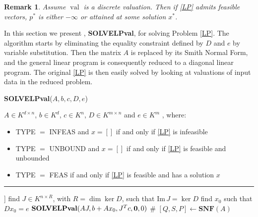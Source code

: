 \documentclass[a4paper,oneside,10pt]{article}
\newtheorem{remark}[theorem]{Remark}
\DeclareMathOperator{\val}{val}
\begin{document}
\begin{remark}
  Assume $\val$ is a discrete valuation. Then
  if \eqref{LP} admits feasible vectors,
  $p^*$ is either $-\infty$ or attained at some solution $x^*$.
\end{remark}

In this section we present , \textbf{SOLVELPval}, for solving Problem \eqref{LP}.
The algorithm starts by eliminating the equality constraint defined by $D$ and $e$
by variable substitution. Then the matrix $A$ is replaced by its Smith Normal Form,
and the general linear program is consequently reduced to a diagonal linear program.
The original \eqref{LP} is then easily solved by looking at valuations of input data
in the reduced problem.

\begin{algorithm}[!ht]
    {\footnotesize
    \caption{\textbf{SOLVELPval}($A,b,c,D,e$)}\label{algo_LP}
    \begin{algorithmic}[1]
      \REQUIRE
      $A \in K^{d\times n}$, $b \in K^d$, $c \in K^n$, $D \in K^{m \times n}$ and $e \in K^m$
      \ENSURE [TYPE, $x$], where:
      \vspace{-0.1cm}
      \begin{itemize}
      \item[]
        TYPE $=$ INFEAS and $x=[]$ if and only if \eqref{LP} is infeasible
        \vspace{-0.1cm}
      \item[]
        TYPE $=$ UNBOUND and $x=[]$ if and only if \eqref{LP} is feasible and unbounded
        \vspace{-0.1cm}
      \item[]
        TYPE $=$ FEAS if and only if \eqref{LP} is feasible and has a solution $x$
      \end{itemize}
      \vspace{-0.1cm}
      \hrule
      \vspace{0.1cm}
      \RETURN [INFEAS, []] \label{step:linear_empty}
      \ENDIF
       \label{step:reducD:begin}
      \STATE find $J \in K^{n \times R}$, with $R = \dim\ker D$, such that $\text{Im}\, J = \ker D$
      \STATE find $x_0$ such that $Dx_0=e$ \label{step:reducD:end}
      \RETURN $\textbf{SOLVELPval}(AJ,b+A x_0,J^T c, {\bf 0},0)$ \label{step:reducD} \hfill {\color{olive} \# }
      \ENDIF
       \label{step:solsLP:begin}
      \STATE $[Q,S,P] \leftarrow \textbf{SNF}(A)$

\end{algorithmic}}
\end{algorithm}
\end{document}
